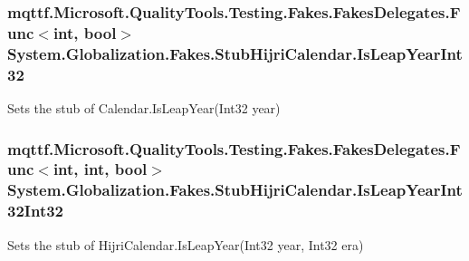 \hypertarget{class_system_1_1_globalization_1_1_fakes_1_1_stub_hijri_calendar_a6e332e2735c2489bbc602ef55c2c5750}{
\subsubsection[{Is\-Leap\-Year\-Int32}]{\setlength{\rightskip}{0pt plus 5cm}mqttf.\-Microsoft.\-Quality\-Tools.\-Testing.\-Fakes.\-Fakes\-Delegates.\-Func$<$int, bool$>$ System.\-Globalization.\-Fakes.\-Stub\-Hijri\-Calendar.\-Is\-Leap\-Year\-Int32}}\label{class_system_1_1_globalization_1_1_fakes_1_1_stub_hijri_calendar_a6e332e2735c2489bbc602ef55c2c5750}


Sets the stub of Calendar.\-Is\-Leap\-Year(\-Int32 year)

\hypertarget{class_system_1_1_globalization_1_1_fakes_1_1_stub_hijri_calendar_a0e798a83f9023d8738569ca2e6a70add}{
\subsubsection[{Is\-Leap\-Year\-Int32\-Int32}]{\setlength{\rightskip}{0pt plus 5cm}mqttf.\-Microsoft.\-Quality\-Tools.\-Testing.\-Fakes.\-Fakes\-Delegates.\-Func$<$int, int, bool$>$ System.\-Globalization.\-Fakes.\-Stub\-Hijri\-Calendar.\-Is\-Leap\-Year\-Int32\-Int32}}\label{class_system_1_1_globalization_1_1_fakes_1_1_stub_hijri_calendar_a0e798a83f9023d8738569ca2e6a70add}


Sets the stub of Hijri\-Calendar.\-Is\-Leap\-Year(\-Int32 year, Int32 era)

